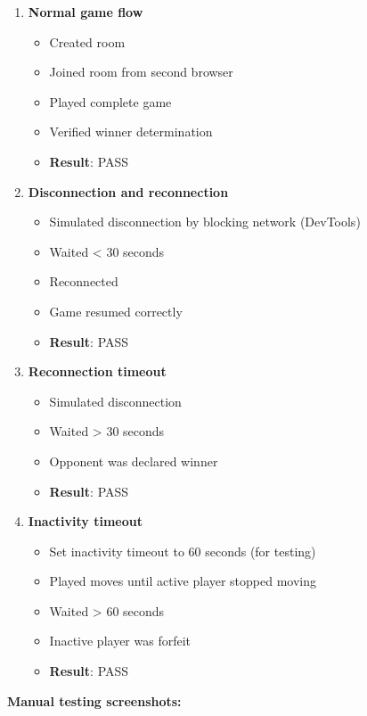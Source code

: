 \documentclass{scrartcl}
\begin{document}
\begin{enumerate}
  \item \textbf{Normal game flow}
  \begin{itemize}
    \item Created room
    \item Joined room from second browser
    \item Played complete game
    \item Verified winner determination
    \item \textbf{Result}: PASS
  \end{itemize}

  \item \textbf{Disconnection and reconnection}
  \begin{itemize}
    \item Simulated disconnection by blocking network (DevTools)
    \item Waited < 30 seconds
    \item Reconnected
    \item Game resumed correctly
    \item \textbf{Result}: PASS
  \end{itemize}

  \item \textbf{Reconnection timeout}
  \begin{itemize}
    \item Simulated disconnection
    \item Waited > 30 seconds
    \item Opponent was declared winner
    \item \textbf{Result}: PASS
  \end{itemize}

  \item \textbf{Inactivity timeout}
  \begin{itemize}
    \item Set inactivity timeout to 60 seconds (for testing)
    \item Played moves until active player stopped moving
    \item Waited > 60 seconds
    \item Inactive player was forfeit
    \item \textbf{Result}: PASS
  \end{itemize}

\end{enumerate}

\textbf{Manual testing screenshots:}
\end{document}
